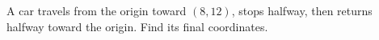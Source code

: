 A car travels from the origin toward $(8,12)$, stops halfway, then returns halfway toward the origin. Find its final coordinates.
